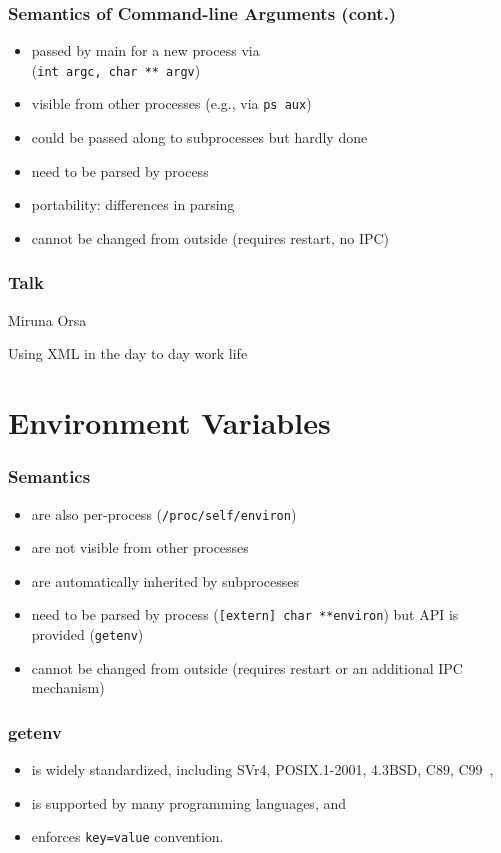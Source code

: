 \begin{frame}
	\frametitle{Semantics of Command-line Arguments (cont.)}
	\begin{itemize}
	\item passed by main for a new process via \\ (\texttt{int argc, char ** argv})
	\item visible from other processes (e.g., via \texttt{ps aux})
	\item could be passed along to subprocesses but hardly done
	\item need to be parsed by process
	\item portability: differences in parsing
	\item cannot be changed from outside (requires restart, no IPC)
	\end{itemize}
\end{frame}

\begin{frame}
	\frametitle{Talk}
	Miruna Orsa

	Using XML in the day to day work life
\end{frame}



\section{Environment Variables}

\begin{frame}
	\frametitle{Semantics}
	\begin{itemize}
	\item are also per-process (\texttt{/proc/self/environ})
	\item are not visible from other processes
	\item are automatically inherited by subprocesses
	\item need to be parsed by process (\texttt{[extern] char **environ}) but API is provided (\texttt{getenv})
	\item cannot be changed from outside (requires restart or an additional IPC mechanism)
	\end{itemize}
\end{frame}

\begin{frame}
	\frametitle{getenv}
	\begin{itemize}
	\item is widely standardized, including SVr4, POSIX.1-2001, 4.3BSD, C89, C99~\cite{man2017getenv},
	\item is supported by many programming languages, and
	\item enforces \texttt{key=value} convention.
	\end{itemize}
\end{frame}

